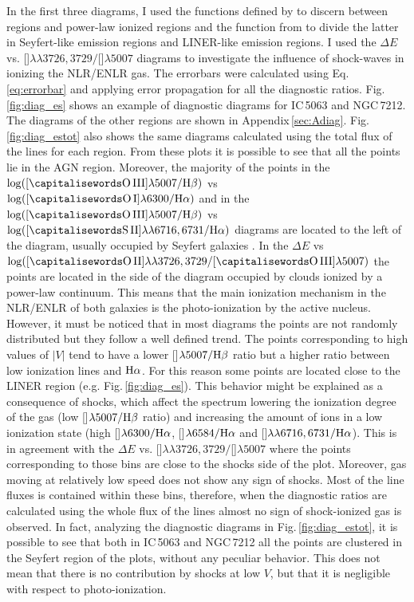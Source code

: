 \documentclass[../main.tex]{subfiles}
\begin{document}
In the first three diagrams, I used the functions defined by \citet{Kewley01} to discern between  regions and power-law ionized regions and the function from \citet{Kewley06} to divide the latter in Seyfert-like emission regions and LINER-like emission regions.
I used the $\Delta E$ vs. []$\lambda\lambda3726,3729/$[]$\lambda5007$ diagrams to investigate the influence of shock-waves in ionizing the NLR/ENLR gas.
The errorbars were calculated using Eq.\,\ref{eq:errorbar} and applying error propagation for all the diagnostic ratios.
Fig.\,\ref{fig:diag_es} shows an example of diagnostic diagrams for IC\,5063 and NGC\,7212.
The diagrams of the other regions are shown in Appendix\,\ref{sec:Adiag}.
Fig.\,\ref{fig:diag_estot} also shows the same diagrams calculated using the total flux of the lines for each region.
From these plots it is possible to see that all the points lie in the AGN region.
Moreover, the majority of the points in the $\log([\rm\ion{O}{III}]\lambda5007/\Hb)$ vs $\log([\rm\ion{O}{I}]\lambda6300/\Ha)$ and in the $\log([\rm\ion{O}{III}]\lambda5007/\Hb)$ vs $\log([\rm\ion{S}{II}]\lambda\lambda6716,6731/\Ha)$ diagrams are located to the left of the diagram, usually occupied by Seyfert galaxies \citep{Kewley06}.
In the $\Delta E$ vs $\log([\rm\ion{O}{II}]\lambda\lambda3726,3729/[\rm\ion{O}{III}]\lambda5007)$ the points are located in the side of the diagram occupied by clouds ionized by a power-law continuum.
This means that the main ionization mechanism in the NLR/ENLR of both galaxies is the photo-ionization by the active nucleus.
However, it must be noticed that in most diagrams the points are not randomly distributed but they follow a well defined trend.
The points corresponding to high values of $\lvert V \lvert$ tend to have a lower []$\lambda5007/\rm H\beta$ ratio but a higher ratio between low ionization lines and $\rm H\alpha$.  
For this reason some points are located close to the LINER region (e.g. Fig.\,\ref{fig:diag_es}).
This behavior might be explained as a consequence of shocks, which affect the spectrum lowering the ionization degree of the gas (low []$\lambda5007/\rm H\beta$ ratio) and increasing the amount of ions in a low ionization state (high []$\lambda6300/\rm H\alpha$, []$\lambda6584/\rm H\alpha$ and []$\lambda\lambda6716,6731/\rm H\alpha$).
This is in agreement with the $\Delta E$ vs. []$\lambda\lambda3726,3729/$[]$\lambda5007$ where the points corresponding to those bins are close to the shocks side of the plot.
Moreover, gas moving at relatively low speed does not show any sign of shocks.
Most of the line fluxes is contained within these bins, therefore, when the diagnostic ratios are calculated using the whole flux of the lines almost no sign of shock-ionized gas is observed.
In fact, analyzing the diagnostic diagrams in Fig.\,\ref{fig:diag_estot}, it is possible to see that both in IC\,5063 and NGC\,7212 all the points are clustered in the Seyfert region of the plots, without any peculiar behavior.
This does not mean that there is no contribution by shocks at low $V$, but that it is negligible with respect to photo-ionization. 
\end{document}
